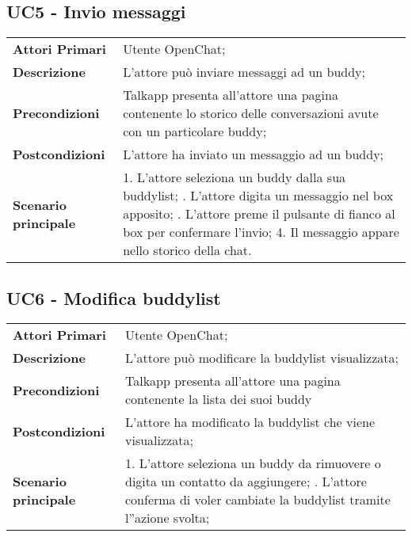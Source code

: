 
\subsection{UC5 - Invio messaggi}
	\begin{center}
	\bgroup
	\def\arraystretch{1.8}     
	\begin{longtable}{  p{4cm} | p{9.5cm} } 
		\textbf{Attori Primari} & Utente OpenChat; \\ 
		\textbf{Descrizione} &  L'attore può inviare messaggi ad un buddy; \\ 
		\textbf{Precondizioni}  & Talkapp presenta all'attore una pagina contenente lo storico delle conversazioni avute con un particolare buddy; \\
		\textbf{Postcondizioni} & L'attore ha inviato un messaggio ad un buddy; \\ 
		\textbf{Scenario principale} & 
		1. L'attore seleziona un buddy dalla sua buddylist; \newline
		2. L'attore digita un messaggio nel box apposito; \newline
		3. L'attore preme il pulsante di fianco al box per confermare l'invio;
		4. Il messaggio appare nello storico della chat.
	\end{longtable}
	\egroup
\end{center}

\subsection{UC6 - Modifica buddylist}
	\begin{center}
	\bgroup
	\def\arraystretch{1.8}     
	\begin{longtable}{  p{4cm} | p{9.5cm} } 
		\textbf{Attori Primari} & Utente OpenChat; \\ 
		\textbf{Descrizione} &  L'attore può modificare la buddylist visualizzata; \\ 
		\textbf{Precondizioni}  & Talkapp presenta all'attore una pagina contenente la lista dei suoi buddy \\
		\textbf{Postcondizioni} & L'attore ha modificato la buddylist che viene visualizzata; \\ 
		\textbf{Scenario principale} & 
		1. L'attore seleziona un buddy da rimuovere o digita un contatto da aggiungere; \newline
		2. L'attore conferma di voler cambiate la buddylist tramite l''azione svolta;
	\end{longtable}
	\egroup
\end{center}

